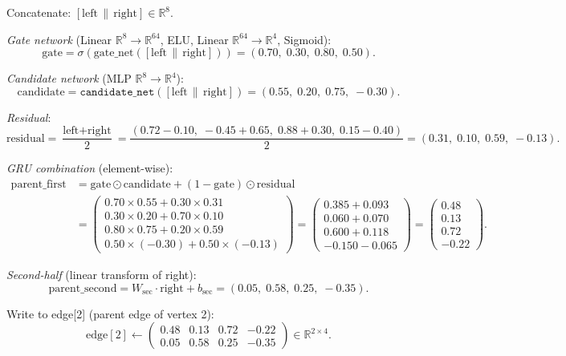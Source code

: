 \documentclass[11pt,a4paper]{article}
\newcommand{\R}{\mathbb{R}}
\newcommand{\concat}{\,\|\,}
\begin{document}
Concatenate: $[\text{left} \concat \text{right}] \in \R^8$.

\medskip
\textit{Gate network} (Linear $\R^8 \to \R^{64}$, ELU, Linear $\R^{64} \to \R^4$, Sigmoid):
\[
\text{gate} = \sigma(\text{gate\_net}([\text{left} \concat \text{right}])) = (0.70,\; 0.30,\; 0.80,\; 0.50).
\]

\textit{Candidate network} (MLP $\R^8 \to \R^4$):
\[
\text{candidate} = \texttt{candidate\_net}([\text{left} \concat \text{right}]) = (0.55,\; 0.20,\; 0.75,\; -0.30).
\]

\textit{Residual}:
\[
\text{residual} = \frac{\text{left} + \text{right}}{2} = \frac{(0.72 - 0.10,\; -0.45 + 0.65,\; 0.88 + 0.30,\; 0.15 - 0.40)}{2} = (0.31,\; 0.10,\; 0.59,\; -0.13).
\]

\textit{GRU combination} (element-wise):
\begin{align*}
\text{parent\_first} &= \text{gate} \odot \text{candidate} + (1 - \text{gate}) \odot \text{residual} \\
&= \begin{pmatrix} 0.70 \times 0.55 + 0.30 \times 0.31 \\ 0.30 \times 0.20 + 0.70 \times 0.10 \\ 0.80 \times 0.75 + 0.20 \times 0.59 \\ 0.50 \times (-0.30) + 0.50 \times (-0.13) \end{pmatrix}
= \begin{pmatrix} 0.385 + 0.093 \\ 0.060 + 0.070 \\ 0.600 + 0.118 \\ -0.150 - 0.065 \end{pmatrix}
= \begin{pmatrix} 0.48 \\ 0.13 \\ 0.72 \\ -0.22 \end{pmatrix}.
\end{align*}

\textit{Second-half} (linear transform of right):
\[
\text{parent\_second} = W_{\text{sec}} \cdot \text{right} + b_{\text{sec}} = (0.05,\; 0.58,\; 0.25,\; -0.35).
\]

Write to edge[2] (parent edge of vertex 2):
\[
\text{edge}[2] \leftarrow \begin{pmatrix} 0.48 & 0.13 & 0.72 & -0.22 \\ 0.05 & 0.58 & 0.25 & -0.35 \end{pmatrix} \in \R^{2 \times 4}.
\]
\end{document}
